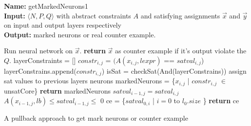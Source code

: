 \begin{algorithm}[t]
  \textbf{Name: } getMarkedNeurons1 \\
  \textbf{Input: } $\langle N,P,Q \rangle$ with abstract constraints $A$ and satisfying assignments $\overrightarrow{x}$ and $\overrightarrow{y}$ on input and output layers respectively\\
  \textbf{Output: } marked neurons or real counter example. 
  \begin{algorithmic}[1]
   \State Run neural network on $\overrightarrow{x}$.
   \State \textbf{return} $\overrightarrow{x}$ as counter example if it's output violate the $Q$. 
        \State layerConstraints = []
          \State $constr_{i,j}$ = $(A(x_{i,j},lexpr)$ == $satval_{i,j}$) 
          \State layerConstrains.append($constr_{i,j}$)
        \EndFor
        \State isSat = checkSat(And(layerConstrains)) 
          \State assign sat values to previous layers neurons
        \Else
          \State markedNeurons = \{$x_{i,j}$ | $constr_{i,j}$ $\in$ unsatCore\}
          \State \textbf{return } markedNeurons
        \EndIf
      \Else {}
            \State $satval_{i-1,j} = satval_{i,j}$
          \Else
            \State $A(x_{i-1,j},lb) \leq satval_{i-1,j} \leq$ 0 
          \EndIf
        \EndFor
      \EndIf
   \EndFor
    \State ce = \{$satval_{0,i}$ | $i=0$ to $l_{0}.size$ \} 
    \State \textbf{return} ce
  \end{algorithmic}
  \caption{A pullback approach to get mark neurons or counter example}
  \label{algo:refine1}
\end{algorithm}


